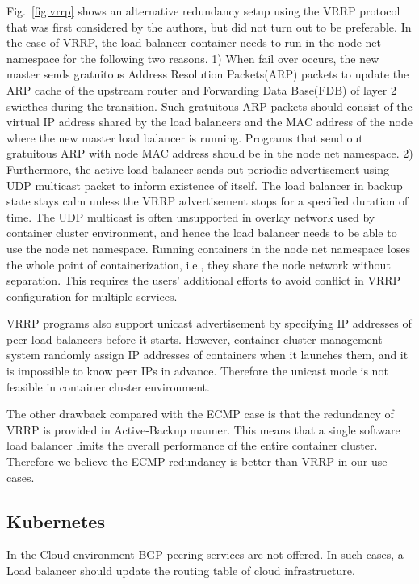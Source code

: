 Fig.~\ref{fig:vrrp} shows an alternative redundancy setup using the VRRP protocol that was first considered by the authors, but did not turn out to be preferable.
In the case of VRRP, the load balancer container needs to run in the node net namespace for the following two reasons.
1) When fail over occurs, the new master sends gratuitous Address Resolution Packets(ARP) packets to update the ARP cache of the upstream router and Forwarding Data Base(FDB) of layer 2 swicthes during the transition.
Such gratuitous ARP packets should consist of the virtual IP address shared by the load balancers and the MAC address of the node where the new master load balancer is running.
Programs that send out gratuitous ARP with node MAC address should be in the node net namespace.
%
2) Furthermore, the active load balancer sends out periodic advertisement using UDP multicast packet to inform existence of itself.
The load balancer in backup state stays calm unless the VRRP advertisement stops for a specified duration of time.
The UDP multicast is often unsupported in overlay network used by container cluster environment, and hence the load balancer needs to be able to use the node net namespace.
%
Running containers in the node net namespace loses the whole point of containerization, i.e., they share the node network without separation.
This requires the users' additional efforts to avoid conflict in VRRP configuration for multiple services.
%

VRRP programs also support unicast advertisement by specifying IP addresses of peer load balancers before it starts.
However, container cluster management system randomly assign IP addresses of containers when it launches them, and it is impossible to know peer IPs in advance. 
Therefore the unicast mode is not feasible in container cluster environment.

The other drawback compared with the ECMP case is that the redundancy of VRRP is provided in Active-Backup manner.
This means that a single software load balancer limits the overall performance of the entire container cluster.
Therefore we believe the ECMP redundancy is better than VRRP in our use cases.


\subsection{Kubernetes}

In the Cloud environment BGP peering services are not offered.
In such cases, a Load balancer should update the routing table of cloud infrastructure.


